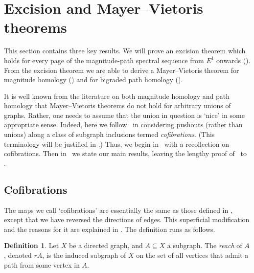 \documentclass[a4paper, 11 pt, oneside, reqno]{amsart}
\numberwithin{lemma}{section}
\theoremstyle{definition}
\newtheorem{definition}[lemma]{Definition}
\newcommand{\demph}[1]{\emph{#1}}
\newcommand{\MPSS}{E}
\begin{document}

\section{Excision and Mayer--Vietoris theorems}\label{sec:BPH_MV}


This section contains three key results. We will prove an excision theorem which holds for every page of the magnitude-path spectral sequence from $\MPSS^1$ onwards (). From the excision theorem we are able to derive a Mayer--Vietoris theorem for magnitude homology () and for bigraded path homology ().

It is well known from the literature on 
both magnitude homology and path homology
that Mayer--Vietoris theorems do not hold for arbitrary unions of 
graphs.
Rather, one needs to assume that the union in question
is `nice' in some appropriate sense.
Indeed, here we follow~\cite{CDKOSW} in considering 
pushouts (rather than unions) along a class of subgraph inclusions termed \emph{cofibrations}. (This terminology will be justified in .)
Thus, we begin in~ with a recollection
on cofibrations.
Then in~ we state our main results,
leaving the lengthy proof of~ 
to .

\subsection{Cofibrations}\label{sec:cofibrations}
The maps we call `cofibrations' are essentially the same as those defined in \cite[Definition 3.9]{CDKOSW}, except that we have reversed the directions of edges. This superficial modification and the reasons for it are explained in . The definition runs as follows.

\begin{definition}
\label{def:reach}
    Let \(X\) be a directed graph, and \(A \subseteq X\) a subgraph. The \demph{reach} of \(A\), denoted \(rA\), is the induced subgraph of \(X\) on the set of all vertices that admit a path from some vertex in \(A\).
\end{definition}
\end{document}
